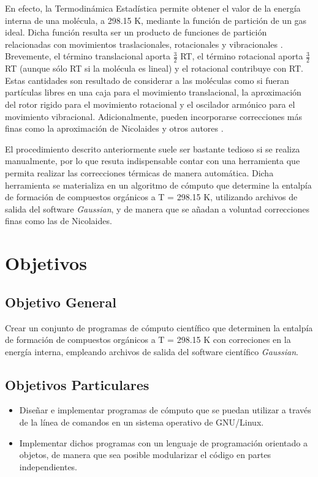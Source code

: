 \documentclass[12pt]{article}
\begin{document}
En efecto, la Termodinámica Estadística permite obtener el valor de la energía interna
de una molécula, a 298.15 K, mediante la función de partición de un gas ideal. Dicha
función resulta ser un producto de funciones de partición relacionadas con movimientos
traslacionales, rotacionales y vibracionales  \cite{McQuarrie1976, Nicolaides1996}.
Brevemente, el término translacional aporta $\frac{3}{2}$ RT, el término
rotacional aporta $\frac{3}{2}$ RT (aunque sólo RT si la molécula es lineal) y el rotacional
contribuye con RT. Estas cantidades son resultado de considerar a las moléculas como si
fueran partículas libres en una caja para el movimiento translacional, la aproximación del rotor
rigido para el movimiento rotacional y el oscilador armónico para el movimiento vibracional.
Adicionalmente, pueden incorporarse correcciones más finas como la aproximación de Nicolaides y otros autores  \cite{McQuarrie1976, Nicolaides1996}.

El procedimiento descrito anteriormente suele ser bastante tedioso si se realiza manualmente,
por lo que resuta indispensable contar con una herramienta que permita realizar
las correcciones térmicas de manera automática. Dicha herramienta se materializa en un
algoritmo de cómputo que determine la entalpía de formación de compuestos orgánicos
a T = 298.15 K, utilizando archivos de salida del software \textit{Gaussian}, y de manera que
se añadan a voluntad correcciones finas como las de Nicolaides.
 
\section*{Objetivos}

\subsection*{Objetivo General}

Crear un conjunto de programas de cómputo científico que determinen la entalpía de formación de compuestos orgánicos a T = 298.15 K con correciones en la energía interna, empleando archivos de salida del software científico \textit{Gaussian}.

\subsection*{Objetivos Particulares}
\begin{itemize}
\item Diseñar e implementar programas de cómputo que se puedan utilizar a través de la línea de comandos en un sistema operativo de GNU/Linux.

\item Implementar dichos programas con un lenguaje de programación orientado a objetos, de
manera que sea posible modularizar el código en partes independientes.
\end{itemize}
\end{document}
